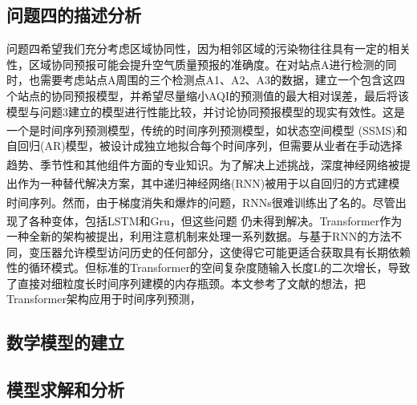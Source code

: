 \documentclass[a4paper,10pt]{my_paper}
\numberwithin{equation}{section}
\begin{document}
\subsection{问题四的描述分析}

问题四希望我们充分考虑区域协同性，因为相邻区域的污染物往往具有一定的相关性，区域协同预报可能会提升空气质量预报的准确度。在对站点A进行检测的同时，也需要考虑站点A周围的三个检测点A1、A2、A3的数据，建立一个包含这四个站点的协同预报模型，并希望尽量缩小AQI的预测值的最大相对误差，最后将该模型与问题3建立的模型进行性能比较，并讨论协同预报模型的现实有效性。这是一个是时间序列预测模型，传统的时间序列预测模型，如状态空间模型 (SSMS)\textsuperscript{\cite{ref10}}和自回归(AR)模型，被设计成独立地拟合每个时间序列，但需要从业者在手动选择趋势、季节性和其他组件方面的专业知识。为了解决上述挑战，深度神经网络\textsuperscript{\cite{ref11}}被提出作为一种替代解决方案，其中递归神经网络(RNN)\textsuperscript{\cite{ref12}}被用于以自回归的方式建模时间序列。然而，由于梯度消失和爆炸的问题，RNNs很难训练出了名的\textsuperscript{\cite{ref13}}。尽管出现了各种变体，包括LSTM\textsuperscript{\cite{ref14}}和Gru\textsuperscript{\cite{ref15}}，但这些问题 仍未得到解决。Transformer\textsuperscript{\cite{ref16}}作为一种全新的架构被提出，利用注意机制来处理一系列数据。与基于RNN的方法不同，变压器允许模型访问历史的任何部分，这使得它可能更适合获取具有长期依赖性的循环模式。但标准的Transformer的空间复杂度随输入长度L的二次增长，导致了直接对细粒度长时间序列建模的内存瓶颈。本文参考了文献\cite{ref17}的想法，把Transformer架构应用于时间序列预测，
\subsection{数学模型的建立}

\subsection{模型求解和分析}
\end{document}
